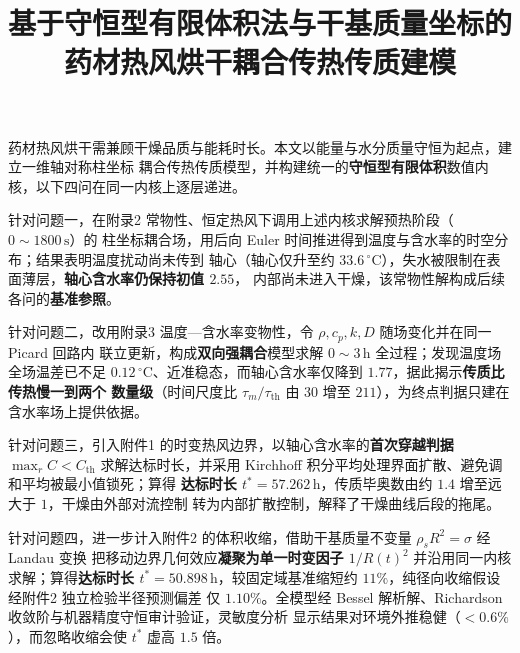 \documentclass[withoutpreface,bwprint]{cumcmthesis}
\title{基于守恒型有限体积法与干基质量坐标的\\药材热风烘干耦合传热传质建模}
\makeatletter
\renewenvironment{abstract}{%

  \if@twocolumn\section*{\abstractname}%

  \else\begin{center}{\zihao{3}\bfseries \abstractname\vspace{-.5em}\vspace{\z@}}\end{center}\quotation

  \fi}{\if@twocolumn\else\endquotation\newpage\fi}
\makeatother
\begin{document}
\maketitle




\begin{abstract}

药材热风烘干需兼顾干燥品质与能耗时长。本文以能量与水分质量守恒为起点，建立一维轴对称柱坐标
耦合传热传质模型，并构建统一的\textbf{守恒型有限体积}数值内核，以下四问在同一内核上逐层递进。

针对问题一，在附录2 常物性、恒定热风下调用上述内核求解预热阶段（$0\sim1800\,\mathrm{s}$）的
柱坐标耦合场，用后向 Euler 时间推进得到温度与含水率的时空分布；结果表明温度扰动尚未传到
轴心（轴心仅升至约 $33.6\,^{\circ}\mathrm{C}$），失水被限制在表面薄层，\textbf{轴心含水率仍保持初值 $2.55$}，
内部尚未进入干燥，该常物性解构成后续各问的\textbf{基准参照}。

针对问题二，改用附录3 温度—含水率变物性，令 $\rho,c_p,k,D$ 随场变化并在同一 Picard 回路内
联立更新，构成\textbf{双向强耦合}模型求解 $0\sim3\,\mathrm{h}$ 全过程；发现温度场全场温差已不足
$0.12\,^{\circ}\mathrm{C}$、近准稳态，而轴心含水率仅降到 $1.77$，据此揭示\textbf{传质比传热慢一到两个
数量级}（时间尺度比 $\tau_m/\tau_{\mathrm{th}}$ 由 $30$ 增至 $211$），为终点判据只建在含水率场上提供依据。

针对问题三，引入附件1 的时变热风边界，以轴心含水率的\textbf{首次穿越判据} $\max_r C<C_{\mathrm{th}}$
求解达标时长，并采用 Kirchhoff 积分平均处理界面扩散、避免调和平均被最小值锁死；算得
\textbf{达标时长 $t^{*}=57.262\,\mathrm{h}$}，传质毕奥数由约 $1.4$ 增至远大于 $1$，干燥由外部对流控制
转为内部扩散控制，解释了干燥曲线后段的拖尾。

针对问题四，进一步计入附件2 的体积收缩，借助干基质量不变量 $\rho_s R^2=\sigma$ 经 Landau 变换
把移动边界几何效应\textbf{凝聚为单一时变因子 $1/R(t)^2$} 并沿用同一内核求解；算得\textbf{达标时长
$t^{*}=50.898\,\mathrm{h}$}，较固定域基准缩短约 $11\%$，纯径向收缩假设经附件2 独立检验半径预测偏差
仅 $1.10\%$。全模型经 Bessel 解析解、Richardson 收敛阶与机器精度守恒审计验证，灵敏度分析
显示结果对环境外推稳健（$<0.6\%$），而忽略收缩会使 $t^*$ 虚高 $1.5$ 倍。


\end{abstract}
\end{document}

